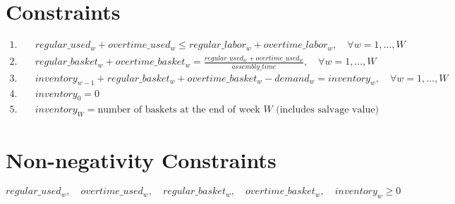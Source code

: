 \documentclass{article}
\begin{document}
\section*{Constraints}
\begin{align*}
1. & \quad regular\_used_w + overtime\_used_w \leq regular\_labor_w + overtime\_labor_w, \quad \forall w = 1, \ldots, W \\
2. & \quad regular\_basket_w + overtime\_basket_w = \frac{regular\_used_w + overtime\_used_w}{assembly\_time}, \quad \forall w = 1, \ldots, W \\
3. & \quad inventory_{w-1} + regular\_basket_w + overtime\_basket_w - demand_w = inventory_w, \quad \forall w = 1, \ldots, W \\
4. & \quad inventory_0 = 0 \\
5. & \quad inventory_W = \text{number of baskets at the end of week } W \text{ (includes salvage value)}
\end{align*}

\section*{Non-negativity Constraints}
\[
regular\_used_w, \quad overtime\_used_w, \quad regular\_basket_w, \quad overtime\_basket_w, \quad inventory_w \geq 0
\]
\end{document}
